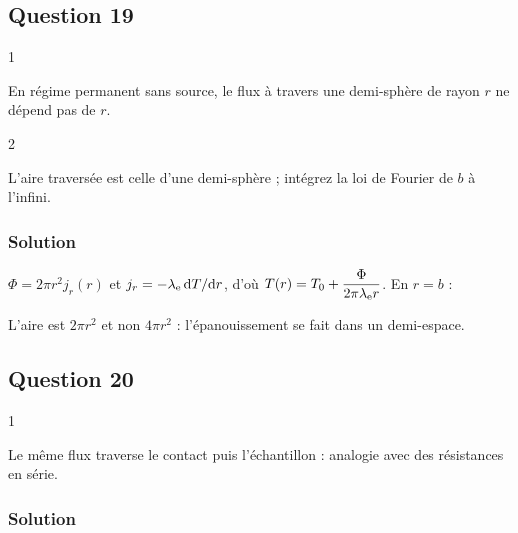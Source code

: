 \documentclass[11pt,a4paper]{article}
\newcommand{\equationajustee}[1]{%
  \sbox{\boiteequation}{$\displaystyle #1$}%
  \ifdim\wd\boiteequation>\linewidth
    \[\resizebox{\linewidth}{!}{\usebox{\boiteequation}}\]%
  \else
    \[#1\]%
  \fi}
\begin{document}
\hypertarget{question-19}{%
\subsection{Question 19}\label{question-19}}

\begin{indication}{1}

En régime permanent sans source, le flux à travers une demi-sphère de rayon \(r\) ne dépend pas de \(r\).

\end{indication}

\begin{indication}{2}

L'aire traversée est celle d'une demi-sphère ; intégrez la loi de Fourier de \(b\) à l'infini.

\end{indication}

\hypertarget{solution-18}{%
\subsubsection{Solution}\label{solution-18}}

\(\Phi=2\pi r^2j_r(r)\) et \(j_r=-\lambda_{\rm e}\,\mathrm dT/\mathrm dr\), d'où \(T(r)=T_0+\dfrac{\Phi}{2\pi\lambda_{\rm e}r}\). En \(r=b\) :

\equationajustee{\boxed{G_{\rm e}=\frac{\Phi}{T_1-T_0}=2\pi\lambda_{\rm e}b}}

\begin{piege}

L'aire est \(2\pi r^2\) et non \(4\pi r^2\) : l'épanouissement se fait dans un demi-espace.

\end{piege}

\hypertarget{question-20}{%
\subsection{Question 20}\label{question-20}}

\begin{indication}{1}

Le même flux traverse le contact puis l'échantillon : analogie avec des résistances en série.

\end{indication}

\hypertarget{solution-19}{%
\subsubsection{Solution}\label{solution-19}}
\end{document}
